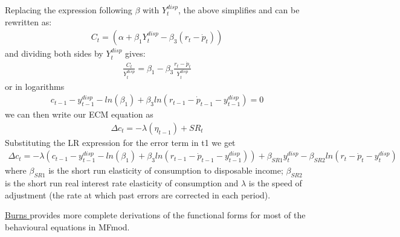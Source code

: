 \documentclass[letterpaper,10pt,english]{jupyterBook}
\begin{document}
\sphinxAtStartPar
Replacing the expression following \(\beta\) with \(Y^{disp}_t\), the above simplifies and can be rewritten as:
\begin{equation*}
\begin{split} C_t= (\alpha + \beta_1{Y^{disp}_t}-\beta_3(r_t-\dot{p}_t))\end{split}
\end{equation*}
\sphinxAtStartPar
and dividing both sides by \(Y^{disp}_t\) gives:
\begin{equation*}
\begin{split}\frac{C_t}{Y^{disp}_t} = \beta_1 -\beta_3\frac{r_t-\dot{p}_t}{Y^{disp}_t}\end{split}
\end{equation*}
\sphinxAtStartPar
or in logarithms
\begin{equation*}
\begin{split}{c_{t-1}}-{y^{disp}_{t-1}} - ln(\beta_1) +\beta_3 ln(r_{t-1}-\dot{p}_{t-1} -{y^{disp}_{t-1}})=0\end{split}
\end{equation*}
\sphinxAtStartPar
we can then write our ECM equation as
\begin{equation*}
\begin{split} \Delta c_t = -\lambda(\eta_{t-1})+ SR_t \end{split}
\end{equation*}
\sphinxAtStartPar
Substituting the LR expression for the error term in t\sphinxhyphen{}1 we get
\begin{equation*}
\begin{split} \Delta c_t = -\lambda({c_{t-1}}-{y^{disp}_{t-1}} - ln(\beta_1) +\beta_3 ln(r_{t-1}-\dot{p}_{t-1} -{y^{disp}_{t-1}}))+ \beta_{SR1}{y^{disp}_{t}} - \beta_{SR2}ln(r_{t}-\dot{p}_{t} -{y^{disp}_{t}})  \end{split}
\end{equation*}
\sphinxAtStartPar
where \(\beta_{SR1}\) is the short run elasticity of consumption to disposable income; \(\beta_{SR2}\) is the short run real interest rate elasticity of consumption and \(\lambda\) is the speed of adjustment (the rate at which past errors are corrected in each period).

\sphinxAtStartPar
\hyperlink{cite.content/litterature:id15}{Burns } provides more complete derivations of the functional forms for most of the behavioural equations in MFmod.

\sphinxstepscope
\end{document}
